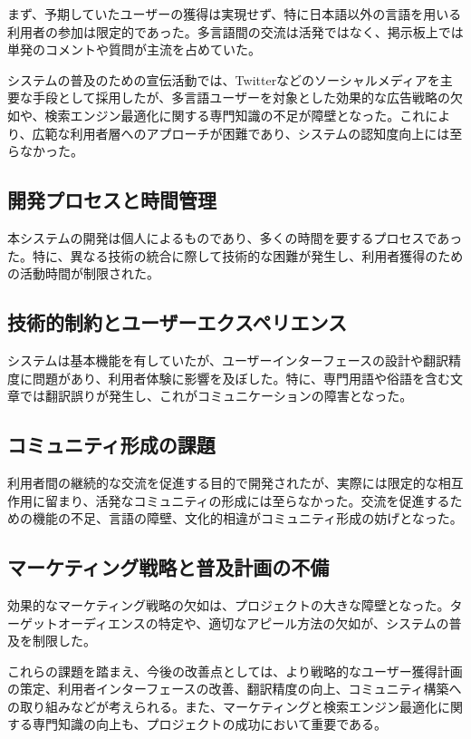 \documentclass[b5paper,12pt,dvipdfmx]{jsreport}
\begin{document}
まず、予期していたユーザーの獲得は実現せず、特に日本語以外の言語を用いる利用者の参加は限定的であった。多言語間の交流は活発ではなく、掲示板上では単発のコメントや質問が主流を占めていた。

システムの普及のための宣伝活動では、Twitterなどのソーシャルメディアを主要な手段として採用したが、多言語ユーザーを対象とした効果的な広告戦略の欠如や、検索エンジン最適化に関する専門知識の不足が障壁となった。これにより、広範な利用者層へのアプローチが困難であり、システムの認知度向上には至らなかった。

\subsection{開発プロセスと時間管理}

本システムの開発は個人によるものであり、多くの時間を要するプロセスであった。特に、異なる技術の統合に際して技術的な困難が発生し、利用者獲得のための活動時間が制限された。

\subsection{技術的制約とユーザーエクスペリエンス}

システムは基本機能を有していたが、ユーザーインターフェースの設計や翻訳精度に問題があり、利用者体験に影響を及ぼした。特に、専門用語や俗語を含む文章では翻訳誤りが発生し、これがコミュニケーションの障害となった。

\subsection{コミュニティ形成の課題}

利用者間の継続的な交流を促進する目的で開発されたが、実際には限定的な相互作用に留まり、活発なコミュニティの形成には至らなかった。交流を促進するための機能の不足、言語の障壁、文化的相違がコミュニティ形成の妨げとなった。

\subsection{マーケティング戦略と普及計画の不備}

効果的なマーケティング戦略の欠如は、プロジェクトの大きな障壁となった。ターゲットオーディエンスの特定や、適切なアピール方法の欠如が、システムの普及を制限した。

これらの課題を踏まえ、今後の改善点としては、より戦略的なユーザー獲得計画の策定、利用者インターフェースの改善、翻訳精度の向上、コミュニティ構築への取り組みなどが考えられる。また、マーケティングと検索エンジン最適化に関する専門知識の向上も、プロジェクトの成功において重要である。
\end{document}
